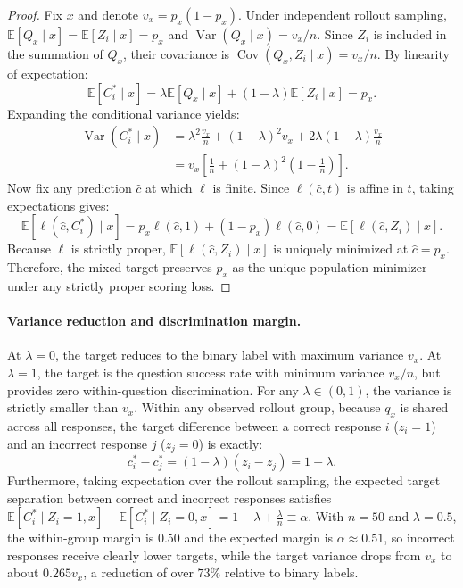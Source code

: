 \documentclass{article} %
\begin{document}
\begin{proof}
Fix $x$ and denote $v_x = p_x(1 - p_x)$. Under independent rollout sampling, $\mathbb E[Q_x \mid x] = \mathbb E[Z_i \mid x] = p_x$ and $\operatorname{Var}(Q_x \mid x) = v_x / n$.
Since $Z_i$ is included in the summation of $Q_x$, their covariance is $\operatorname{Cov}(Q_x, Z_i \mid x) = v_x / n$.
By linearity of expectation:
\begin{equation}
    \mathbb E[C_i^* \mid x] = \lambda \mathbb E[Q_x \mid x] + (1 - \lambda)\mathbb E[Z_i \mid x] = p_x.
\end{equation}
Expanding the conditional variance yields:
\begin{align}
    \operatorname{Var}(C_i^* \mid x)
    &= \lambda^2 \frac{v_x}{n} + (1 - \lambda)^2 v_x + 2\lambda(1 - \lambda)\frac{v_x}{n} \\
    &= v_x \left[ \frac{1}{n} + (1 - \lambda)^2 \left(1 - \frac{1}{n}\right) \right].
\end{align}
Now fix any prediction $\hat c$ at which $\ell$ is finite. Since $\ell(\hat c, t)$ is affine in $t$, taking expectations gives:
\begin{equation}
    \mathbb E[\ell(\hat c, C_i^*) \mid x] = p_x \ell(\hat c, 1) + (1 - p_x) \ell(\hat c, 0) = \mathbb E[\ell(\hat c, Z_i) \mid x].
\end{equation}
Because $\ell$ is strictly proper, $\mathbb E[\ell(\hat c, Z_i) \mid x]$ is uniquely minimized at $\hat c = p_x$.
Therefore, the mixed target preserves $p_x$ as the unique population minimizer under any strictly proper scoring loss.
\end{proof}

\paragraph{Variance reduction and discrimination margin.}
At $\lambda = 0$, the target reduces to the binary label with maximum variance $v_x$.
At $\lambda = 1$, the target is the question success rate with minimum variance $v_x / n$, but provides zero within-question discrimination.
For any $\lambda \in (0, 1)$, the variance is strictly smaller than $v_x$.
Within any observed rollout group, because $q_x$ is shared across all responses, the target difference between a correct response $i$ ($z_i = 1$) and an incorrect response $j$ ($z_j = 0$) is exactly:
\begin{equation}
    c_i^* - c_j^* = (1 - \lambda)(z_i - z_j) = 1 - \lambda.
\end{equation}
Furthermore, taking expectation over the rollout sampling, the expected target separation between correct and incorrect responses satisfies $\mathbb E[C_i^* \mid Z_i = 1, x] - \mathbb E[C_i^* \mid Z_i = 0, x] = 1 - \lambda + \frac{\lambda}{n} \equiv \alpha$.
With $n = 50$ and $\lambda = 0.5$, the within-group margin is $0.50$ and the expected margin is $\alpha \approx 0.51$, so incorrect responses receive clearly lower targets, while the target variance drops from $v_x$ to about $0.265v_x$, a reduction of over $73\%$ relative to binary labels.
\end{document}

